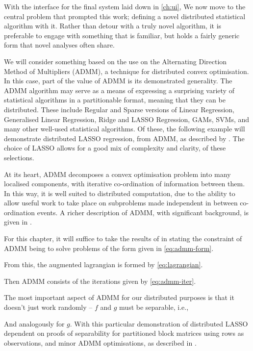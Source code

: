 With the interface for the final system laid down in \cref{ch:ui}, We now move to the central problem that prompted this work; defining a novel distributed statistical algorithm with it.
Rather than detour with a truly novel algorithm, it is preferable to engage with something that is familiar, but holds a fairly generic form that novel analyses often share.

We will consider something based on the use on the Alternating Direction Method of Multipliers (ADMM), a technique for distributed convex optimisation.
In this case, part of the value of ADMM is its demonstrated generality.
The ADMM algorithm may serve as a means of expressing a surprising variety of statistical algorithms in a partitionable format, meaning that they can be distributed.
These include Regular and Sparse versions of Linear Regression, Generalised Linear Regression, Ridge and LASSO Regression, GAMs, SVMs, and many other well-used statistical algorithms.
Of these, the following example will demonstrate distributed LASSO regression, from ADMM, as described by \textcite{mateos2010}.
The choice of LASSO allows for a good mix of complexity and clarity, of these selections.

At its heart, ADMM decomposes a convex optimisation problem into many localised components, with iterative co-ordination of information between them.
In this way, it is well suited to distributed computation, due to the ability to allow useful work to take place on subproblems made independent in between co-ordination events.
A richer description of ADMM, with significant background, is given in \textcite{boyd2011}.

For this chapter, it will suffice to take the results of \textcite{boyd2011} in stating the constraint of ADMM being to solve problems of the form given in \cref{eq:admm-form}.


From this, the augmented lagrangian is formed by \cref{eq:lagrangian}.


Then ADMM consists of the iterations given by \cref{eq:admm-iter}.


The most important aspect of ADMM for our distributed purposes is that it doesn't just work randomly -- \(f\) and \(g\) must be separable, i.e.,


And analogously for \(g\).
With this particular demonstration of distributed LASSO dependent on proofs of separability for partitioned block matrices using rows as observations, and minor ADMM optimisations, as described in \textcite{boyd2011}.

